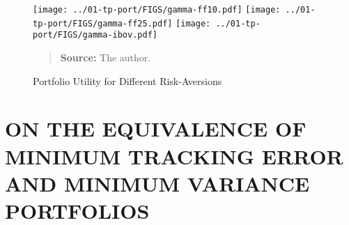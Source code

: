 \documentclass[12pt,oneside,a4paper]{memoir}
\begin{document}
\clearpage

%    


\begin{figure}[ht!]
\centering
\scriptsize
\caption{Portfolio Utility for Different Risk-Aversions}
\label{fig:gamas} %
\vspace{-1 em}

\vspace{-1 em}
\texttt{[image: ../01-tp-port/FIGS/gamma-ff10.pdf]}
\vspace{-1 em}
\texttt{[image: ../01-tp-port/FIGS/gamma-ff25.pdf]}
\vspace{-1 em}
\texttt{[image: ../01-tp-port/FIGS/gamma-ibov.pdf]}
\vspace{-1 em}
\begin{quote}
\textbf{Source:} The author.
\end{quote}
\end{figure}


\chapter{ON THE EQUIVALENCE OF MINIMUM TRACKING ERROR AND MINIMUM VARIANCE PORTFOLIOS}
\end{document}
